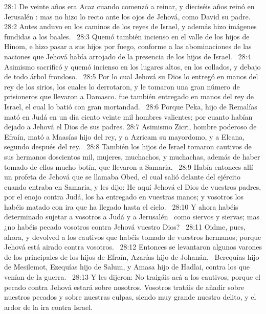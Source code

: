 																												
																												28:1 De veinte años era Acaz cuando comenzó a reinar, y dieciséis años reinó en Jerusalén : mas no hizo lo recto ante los ojos de Jehová, como David su padre.  
																												28:2 Antes anduvo en los caminos de los reyes de Israel, y además hizo imágenes fundidas a los baales.  
																												28:3 Quemó también incienso en el valle de los hijos de Hinom, e hizo pasar a sus hijos por fuego, conforme a las abominaciones de las naciones que Jehová había arrojado de la presencia de los hijos de Israel.  
																												28:4 Asimismo sacrificó y quemó incienso en los lugares altos, en los collados, y debajo de todo árbol frondoso.  
																												28:5 Por lo cual Jehová su Dios lo entregó en manos del rey de los sirios, los cuales lo derrotaron, y le tomaron una gran número de prisioneros que llevaron a Damasco. fue también entregado en manos del rey de Israel, el cual lo batió con gran mortandad.  
																												28:6 Porque Peka, hijo de Remalías mató en Judá en un día ciento veinte mil hombres valientes; por cuanto habían dejado a Jehová el Dios de sus padres. 
																												28:7 Asimismo Zicri, hombre poderoso de Efraín, mató a Maasías hijo del rey, y a Azricam su mayordomo, y a Elcana, segundo después del rey.  
																												28:8 También los hijos de Israel tomaron cautivos de sus hermanos doscientos mil, mujeres, muchachos, y muchachas, además de haber tomado de ellos mucho botín, que llevaron a Samaria.  
																												28:9 Había entonces allí un profeta de Jehová que se llamaba Obed, el cual salió delante del ejército cuando entraba en Samaria, y les dijo: He aquí Jehová el Dios de vuestros padres, por el enojo contra Judá, los ha entregado en vuestras manos; y vosotros los habéis matado con ira que ha llegado hasta el cielo.  
																												28:10 Y ahora habéis determinado sujetar a vosotros a Judá y a Jerusalén  como siervos y siervas; mas ¿no habéis pecado vosotros contra Jehová vuestro Dios?  
																												28:11 Oidme, pues, ahora, y devolved a los cautivos que habéis tomado de vuestros hermanos; porque Jehová está airado contra vosotros.  
																												28:12 Entonces se levantaron algunos varones de los principales de los hijos de Efraín, Azarías hijo de Johanán,  Berequías hijo de Mesilemot, Ezequías hijo de Salum, y Amasa hijo de Hadlai, contra los que venían de la guerra.  
																												28:13 Y les dijeron: No traigáis acá a los cautivos, porque el pecado contra Jehová estará sobre nosotros. Vosotros tratáis de añadir sobre nuestros pecados y sobre nuestras culpas, siendo muy grande nuestro delito, y el ardor de la ira contra Israel.  
